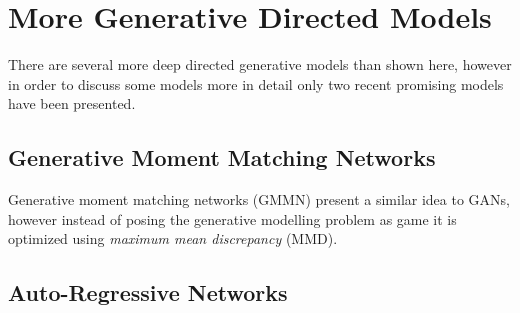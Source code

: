 \newpage
\section{More Generative Directed Models}
\label{sec:more}

There are several more deep directed generative models than shown here, however in order to discuss some models more in detail only two recent promising models have been presented.


\subsection{Generative Moment Matching Networks}
\label{sub:more_mmn}
Generative moment matching networks (GMMN) present a similar idea to GANs, however instead of posing the generative modelling problem as game it is optimized using \emph{maximum mean discrepancy} (MMD).

\vspace{10cm}

\subsection{Auto-Regressive Networks}
\label{sub:more_arn}




